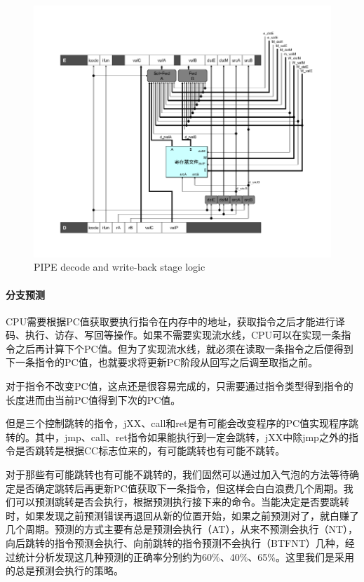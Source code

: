 \begin{figure}[htbp]
\centering
\includegraphics{img/pipe-decode.png}
\caption{PIPE decode and write-back stage logic}
\end{figure}

\paragraph{分支预测}\label{ux5206ux652fux9884ux6d4b}

CPU需要根据PC值获取要执行指令在内存中的地址，获取指令之后才能进行译码、执行、访存、写回等操作。如果不需要实现流水线，CPU可以在实现一条指令之后再计算下个PC值。但为了实现流水线，就必须在读取一条指令之后便得到下一条指令的PC值，也就要求将更新PC阶段从回写之后调至取指之前。

对于指令不改变PC值，这点还是很容易完成的，只需要通过指令类型得到指令的长度进而由当前PC值得到下次的PC值。

但是三个控制跳转的指令，jXX、call和ret是有可能会改变程序的PC值实现程序跳转的。其中，jmp、call、ret指令如果能执行到一定会跳转，jXX中除jmp之外的指令是否跳转是根据CC标志位来的，有可能跳转也有可能不跳转。

对于那些有可能跳转也有可能不跳转的，我们固然可以通过加入气泡的方法等待确定是否确定跳转后再更新PC值获取下一条指令，但这样会白白浪费几个周期。我们可以预测跳转是否会执行，根据预测执行接下来的命令。当能决定是否要跳转时，如果发现之前预测错误再退回从新的位置开始，如果之前预测对了，就白赚了几个周期。预测的方式主要有总是预测会执行（AT），从来不预测会执行（NT），向后跳转的指令预测会执行、向前跳转的指令预测不会执行（BTFNT）几种，经过统计分析发现这几种预测的正确率分别约为60\%、40\%、65\%。这里我们是采用的总是预测会执行的策略。

